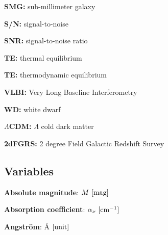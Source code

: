 \documentclass[a4paper,11pt]{article}
\begin{document}
{\noindent}\textbf{SMG:} sub-millimeter galaxy

{\noindent}\textbf{S/N:} signal-to-noise

{\noindent}\textbf{SNR:} signal-to-noise ratio

{\noindent}\textbf{TE:} thermal equilibrium

{\noindent}\textbf{TE:} thermodynamic equilibrium

{\noindent}\textbf{VLBI:} Very Long Baseline Interferometry

{\noindent}\textbf{WD:} white dwarf

{\noindent}\textbf{$\Lambda$CDM:} $\Lambda$ cold dark matter

{\noindent}\textbf{2dFGRS:} 2 degree Field Galactic Redshift Survey








































\newpage
\subsection{Variables}

{\noindent}\textbf{Absolute magnitude}: $M ~ [{\rm mag}]$

{\noindent}\textbf{Absorption coefficient}: $\alpha_\nu ~ [{\rm cm^{-1}}]$

{\noindent}\textbf{Angstr\"{o}m}: \AA$ ~ [{\rm unit}]$
\end{document}
